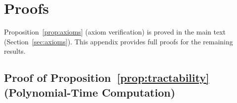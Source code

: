 \section{Proofs}
\label{app:proofs}

Proposition~\ref{prop:axioms} (axiom verification) is proved in the main text
(Section~\ref{sec:axioms}). This appendix provides full proofs for the
remaining results.


\subsection{Proof of Proposition~\ref{prop:tractability} (Polynomial-Time Computation)}
\label{app:proof_tractability}


